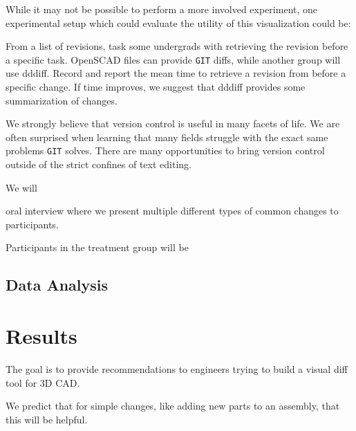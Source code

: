 \documentclass[sigconf]{acmart}
\begin{document}
While it may not be possible to perform a more involved experiment,
one experimental setup which could evaluate the utility of this visualization could be:

From a list of revisions, task some undergrads with retrieving the revision before a specific task.
OpenSCAD files can provide \texttt{GIT} diffs, while another group will use dddiff.
Record and report the mean time to retrieve a revision from before a specific change.
If time improves, we suggest that dddiff provides some summarization of changes.






We strongly believe that version control is useful in many facets of life.
We are often surprised when learning that many fields struggle with the exact same problems \texttt{GIT} solves.
There are many opportunities to bring version control outside of the strict confines of text editing.





We will

oral interview where we present multiple different types of common changes to participants.

Participants in the treatment group will be

\subsection{Data Analysis}

\section{Results}

The goal is to provide recommendations to engineers trying to build a visual diff tool for 3D CAD.

We predict that for simple changes, like adding new parts to an assembly, that this will be helpful.
\end{document}
